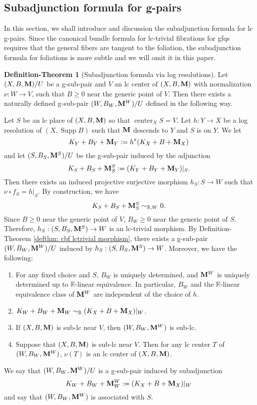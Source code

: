 \documentclass[11pt]{amsart}
\numberwithin{equation}{section}
\newcommand{\Mm}{{\bf{M}}}
\newcommand{\Rr}{\mathbb{R}}
\newcommand{\Center}{\operatorname{center}}
\newcommand{\Supp}{\operatorname{Supp}}
\theoremstyle{definition}
\theoremstyle{definition}
\newtheorem{defthm}[thm]{Definition-Theorem}
\theoremstyle{definition}
\begin{document}
\subsection{Subadjunction formula for g-pairs}

In this section, we shall introduce and discussion the subadjunction formula for lc g-pairs. Since the canonical bundle formula for lc-trivial fibrations for gfqs requires that the general fibers are tangent to the foliation, the subadjunction formula for foliations is more subtle and we will omit it in this paper.

\begin{defthm}[Subadjunction formula via log resolutions]\label{defthm: subadjun}
    Let $(X,B,\Mm)/U$ be a g-sub-pair and $V$ an lc center of $(X,B,\Mm)$ with normalization $\nu: W\rightarrow V$, such that $B\geq 0$ near the generic point of $V$. Then there exists a naturally defined g-sub-pair $(W,B_W,\Mm^W)/U$ defined in the following way. 
    
    Let $S$ be an lc place of $(X,B,\Mm)$ so that $\Center_XS=V$. Let $h: Y\rightarrow X$ be a log resolution of $(X,\Supp B)$ such that $\Mm$ descends to $Y$ and $S$ is on $Y$. We let 
    $$K_Y+B_Y+\Mm_Y:=h^*(K_X+B+\Mm_X)$$
    and let $(S,B_S,\Mm^S)/U$ be the g-sub-pair induced by the adjunction
    $$K_S+B_S+\Mm^S_S:=(K_Y+B_Y+\Mm_Y)|_S.$$
    Then there exists an induced projective surjective morphism $h_S: S\rightarrow W$ such that $\nu\circ f_S=h|_S$. By construction, we have
    $$K_S+B_S+\Mm^S_S\sim_{\mathbb R,W}0.$$
    Since  $B\geq 0$ near the generic point of $V$, $B_W\geq 0$ near the generic point of $S$. Therefore, $h_S: (S,B_S,\Mm^S)\rightarrow W$ is an lc-trivial morphism. By Definition-Theorem \ref{defthm: cbf lctrivial morphism}, there exists a g-sub-pair $(W,B_W,\Mm^W)/U$ induced by $h_S: (S,B_S,\Mm^S)\rightarrow W$. Moreover, we have the following:
    \begin{enumerate}
        \item For any fixed choice and $S$, $B_W$ is uniquely determined, and $\Mm^W$ is uniquely determined up to $\Rr$-linear equivalence. In particular, $B_W$ and the $\Rr$-linear equivalence class of $\Mm^W$ are independent of the choice of $h$.
        \item $K_W+B_W+\Mm_W\sim_{\mathbb R}(K_X+B+\Mm_X)|_{W}$.
        \item If $(X,B,\Mm)$ is sub-lc near $V$, then $(W,B_W,\Mm^W)$ is sub-lc.
         \item Suppose that $(X,B,\Mm)$ is sub-lc near $V$.  Then for any lc center $T$ of $(W,B_W,\Mm^W)$, $\nu(T)$ is an lc center of $(X,B,\Mm)$.
    \end{enumerate}
    We say that $(W,B_W,\Mm^W)/U$ is a g-sub-pair induced by subadjunction
    $$K_W+B_W+\Mm^W_W:=(K_X+B+\Mm_X)|_W$$
    and say that $(W,B_W,\Mm^W)$ is associated with $S$.
\end{defthm}
\end{document}
